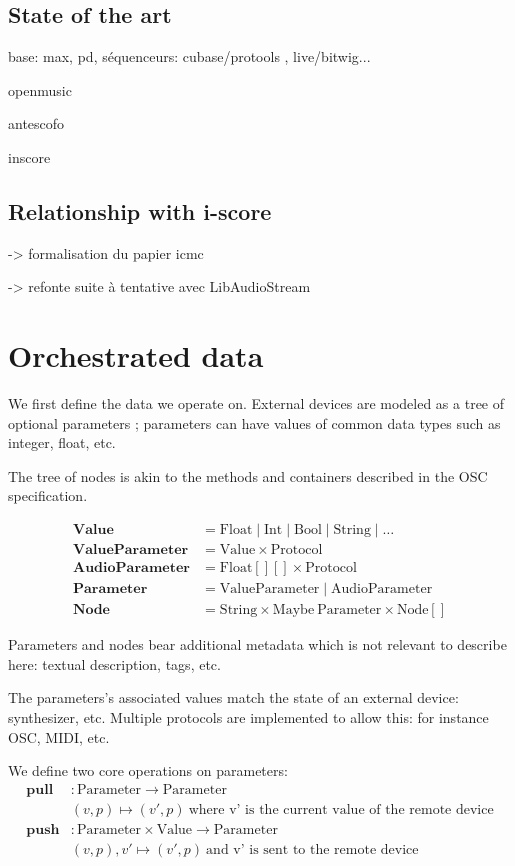 \documentclass[applsci,article,submit,moreauthors,pdftex,10pt,a4paper]{mdpi}
\begin{document}
\subsection{State of the art}
base: max, pd, séquenceurs: cubase/protools , live/bitwig...

openmusic

antescofo

inscore

\subsection{Relationship with i-score}
-> formalisation du papier icmc

-> refonte suite à tentative avec LibAudioStream

\section{Orchestrated data}
We first define the data we operate on. 
External devices are modeled as a tree of optional parameters ; parameters can have values of common data types such as integer, float, etc.

The tree of nodes is akin to the methods and containers described in the OSC specification.

\begin{align*}
\mathbf{Value} & = \mathrm{Float} \mid \mathrm{Int} \mid \mathrm{Bool} \mid \mathrm{String} \mid \dots \\
\mathbf{ValueParameter} & = \mathrm{Value} \times \mathrm{Protocol} \\
\mathbf{AudioParameter} & = \mathrm{Float[][]} \times \mathrm{Protocol} \\
\mathbf{Parameter} & = \mathrm{ValueParameter} \mid \mathrm{AudioParameter} \\
\mathbf{Node} & = \mathrm{String} \times \mathrm{Maybe}~\mathrm{Parameter} \times \mathrm{Node[]} 
\end{align*}

Parameters and nodes bear additional metadata which is not relevant to describe here: textual description, tags, etc.

The parameters's associated values match the state of an external device: synthesizer, etc.
Multiple protocols are implemented to allow this: for instance OSC, MIDI, etc.

We define two core operations on parameters: 
\begin{align*}
\mathbf{pull} & : \mathrm{Parameter} \rightarrow \mathrm{Parameter} \\
              & (v, p) \mapsto (v', p)~\text{where v' is the current value of the remote device}\\
\mathbf{push} &: \mathrm{Parameter} \times \mathrm{Value} \rightarrow \mathrm{Parameter} \\
              & (v, p), v' \mapsto (v', p)~\text{and v' is sent to the remote device} 
\end{align*}
\end{document}
